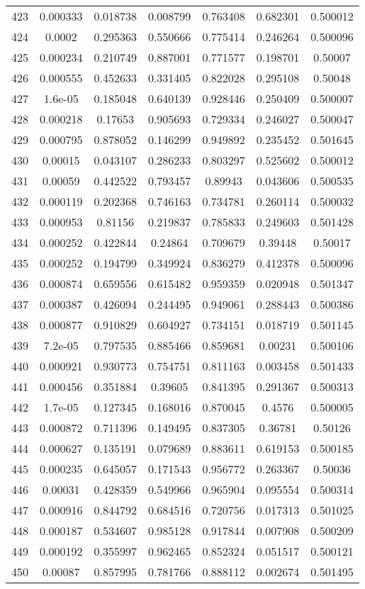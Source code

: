 \begin{table}
\begin{tabular}{c|c|c|c|c|c|c}
423 & 0.000333 & 0.018738 & 0.008799 & 0.763408 & 0.682301 & 0.500012\\
424 & 0.0002 & 0.295363 & 0.550666 & 0.775414 & 0.246264 & 0.500096\\
425 & 0.000234 & 0.210749 & 0.887001 & 0.771577 & 0.198701 & 0.50007\\
426 & 0.000555 & 0.452633 & 0.331405 & 0.822028 & 0.295108 & 0.50048\\
427 & 1.6e-05 & 0.185048 & 0.640139 & 0.928446 & 0.250409 & 0.500007\\
428 & 0.000218 & 0.17653 & 0.905693 & 0.729334 & 0.246027 & 0.500047\\
429 & 0.000795 & 0.878052 & 0.146299 & 0.949892 & 0.235452 & 0.501645\\
430 & 0.00015 & 0.043107 & 0.286233 & 0.803297 & 0.525602 & 0.500012\\
431 & 0.00059 & 0.442522 & 0.793457 & 0.89943 & 0.043606 & 0.500535\\
432 & 0.000119 & 0.202368 & 0.746163 & 0.734781 & 0.260114 & 0.500032\\
433 & 0.000953 & 0.81156 & 0.219837 & 0.785833 & 0.249603 & 0.501428\\
434 & 0.000252 & 0.422844 & 0.24864 & 0.709679 & 0.39448 & 0.50017\\
435 & 0.000252 & 0.194799 & 0.349924 & 0.836279 & 0.412378 & 0.500096\\
436 & 0.000874 & 0.659556 & 0.615482 & 0.959359 & 0.020948 & 0.501347\\
437 & 0.000387 & 0.426094 & 0.244495 & 0.949061 & 0.288443 & 0.500386\\
438 & 0.000877 & 0.910829 & 0.604927 & 0.734151 & 0.018719 & 0.501145\\
439 & 7.2e-05 & 0.797535 & 0.885466 & 0.859681 & 0.00231 & 0.500106\\
440 & 0.000921 & 0.930773 & 0.754751 & 0.811163 & 0.003458 & 0.501433\\
441 & 0.000456 & 0.351884 & 0.39605 & 0.841395 & 0.291367 & 0.500313\\
442 & 1.7e-05 & 0.127345 & 0.168016 & 0.870045 & 0.4576 & 0.500005\\
443 & 0.000872 & 0.711396 & 0.149495 & 0.837305 & 0.36781 & 0.50126\\
444 & 0.000627 & 0.135191 & 0.079689 & 0.883611 & 0.619153 & 0.500185\\
445 & 0.000235 & 0.645057 & 0.171543 & 0.956772 & 0.263367 & 0.50036\\
446 & 0.00031 & 0.428359 & 0.549966 & 0.965904 & 0.095554 & 0.500314\\
447 & 0.000916 & 0.844792 & 0.684516 & 0.720756 & 0.017313 & 0.501025\\
448 & 0.000187 & 0.534607 & 0.985128 & 0.917844 & 0.007908 & 0.500209\\
449 & 0.000192 & 0.355997 & 0.962465 & 0.852324 & 0.051517 & 0.500121\\
450 & 0.00087 & 0.857995 & 0.781766 & 0.888112 & 0.002674 & 0.501495\\
\end{tabular}
\end{table}
